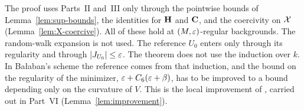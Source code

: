 \begin{remark}
The proof uses Parts~II and~III only through the pointwise bounds of Lemma~\ref{lem:sup-bounds}, the identities for $\mathbf H$ and $\mathbf C$, and the coercivity on $\mathcal X$ (Lemma~\ref{lem:X-coercive}). All of these hold at $(M,\varepsilon)$-regular backgrounds. The random-walk expansion is not used. The reference $U_0$ enters only through its regularity and through $|J_{U_0}|\le\varepsilon$. The theorem does not use the induction over $k$. In Ba\l aban's scheme the reference comes from that induction, and the bound on the regularity of the minimizer, $\varepsilon+C_6(\varepsilon+\beta)$, has to be improved to a bound depending only on the curvature of $V$. This is the local improvement of \cite[Sect.~F]{BalVar}, carried out in Part~VI (Lemma~\ref{lem:improvement}).
\end{remark}
